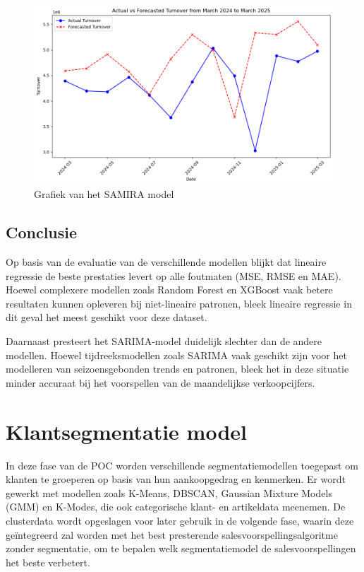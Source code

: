 \begin{figure}[H]
    \centering
    \includegraphics[width=1\linewidth]{images/Samira/Samiragrafiek}
    \caption{Grafiek van het SAMIRA model}
    \label{fig:GrafiekSAMIRA}
\end{figure}

\subsection{Conclusie}

Op basis van de evaluatie van de verschillende modellen blijkt dat lineaire regressie de beste prestaties levert op alle foutmaten (MSE, RMSE en MAE). Hoewel complexere modellen zoals Random Forest en XGBoost vaak betere resultaten kunnen opleveren bij niet-lineaire patronen, bleek lineaire regressie in dit geval het meest geschikt voor deze dataset.

\vspace{1em} 

Daarnaast presteert het SARIMA-model duidelijk slechter dan de andere modellen. Hoewel tijdreeksmodellen zoals SARIMA vaak geschikt zijn voor het modelleren van seizoensgebonden trends en patronen, bleek het in deze situatie minder accuraat bij het voorspellen van de maandelijkse verkoopcijfers.


\newpage

\section{Klantsegmentatie model}

In deze fase van de POC worden verschillende segmentatiemodellen toegepast om klanten te groeperen op basis van hun aankoopgedrag en kenmerken. Er wordt gewerkt met modellen zoals K-Means, DBSCAN, Gaussian Mixture Models (GMM) en K-Modes, die ook categorische klant- en artikeldata meenemen. De clusterdata wordt opgeslagen voor later gebruik in de volgende fase, waarin deze geïntegreerd zal worden met het best presterende salesvoorspellingsalgoritme zonder segmentatie, om te bepalen welk segmentatiemodel de salesvoorspellingen het beste verbetert.

